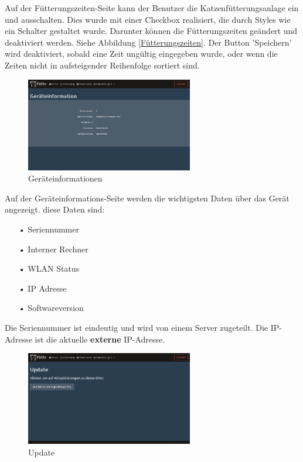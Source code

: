 Auf der Fütterungszeiten-Seite kann der Benutzer die Katzenfütterungsanlage ein und ausschalten. Dies wurde mit einer Checkbox realisiert, die durch Styles wie ein Schalter gestaltet wurde. Darunter können die Fütterungszeiten geändert und deaktiviert werden. Siehe Abbildung \ref{Fütterungszeiten}. Der Button 'Speichern' wird deaktiviert, sobald eine Zeit ungültig eingegeben wurde, oder wenn die Zeiten nicht in aufsteigender Reihenfolge sortiert sind. \newpage

\begin{figure}
\vspace{-10pt}
  \begin{center}
    \includegraphics[width=0.65\textwidth]{Bilder/Greistorfer/Gerateinformation}
  \end{center}
  \caption{Geräteinformationen}
  \label{Geräteinformationen}
  \vspace{-60pt}
\end{figure}

Auf der Geräteinformations-Seite werden die wichtigsten Daten über das Gerät angezeigt. diese Daten sind:
\begin{itemize}
\item[•]Seriennummer
\item[•]Interner Rechner
\item[•]WLAN Status
\item[•]IP Adresse
\item[•]Softwareversion
\end{itemize}
Die Seriennummer ist eindeutig und wird von einem Server zugeteilt. Die IP-Adresse ist die aktuelle \textbf{externe} IP-Adresse. \\

\begin{figure}
\vspace{-10pt}
  \begin{center}
    \includegraphics[width=0.65\textwidth]{Bilder/Greistorfer/Update}
  \end{center}
  \caption{Update}
  \label{Update}
  \vspace{-10pt}
\end{figure}

